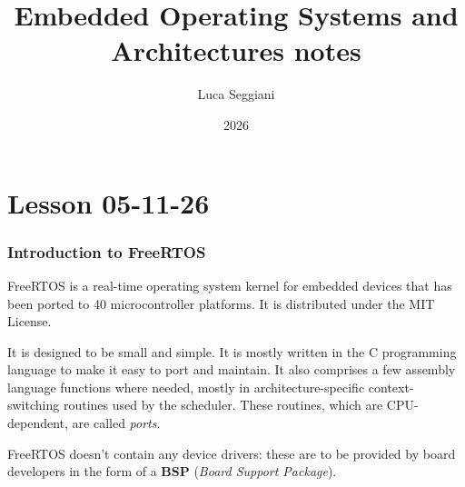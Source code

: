 \documentclass[a4paper,11pt]{article}
\title{Embedded Operating Systems and Architectures notes}
\author{Luca Seggiani}
\date{2026}
\begin{document}
\section{Lesson 05-11-26}

\thispagestyle{empty}
\pagestyle{fancy}

\subsubsection{Introduction to FreeRTOS}

FreeRTOS is a real-time operating system kernel for embedded devices that has been ported to 40 microcontroller platforms. It is distributed under the MIT License.

It is designed to be small and simple. It is mostly written in the C programming language to make it easy to port and maintain. It also comprises a few assembly language functions where needed, mostly in architecture-specific context-switching routines used by the scheduler. These routines, which are CPU-dependent, are called \textit{ports}.

FreeRTOS doesn't contain any device drivers: these are to be provided by board developers in the form of a \textbf{BSP} (\textit{Board Support Package}).
\end{document}
